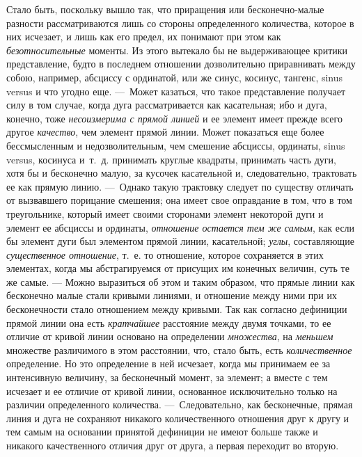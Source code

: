 Стало быть, поскольку вышло так, что приращения или бесконечно-малые
разности рассматриваются лишь со стороны определенного количества, которое
в них исчезает, и лишь как его предел, их понимают при этом как
{\em безотносительные} моменты. Из этого вытекало бы не
выдерживающее критики представление, будто в последнем отношении
дозволительно приравнивать между собою, например, абсциссу с ординатой, или
же синус, косинус, тангенс, sinus versus и что угодно еще. ---~Может
казаться, что такое представление получает силу в том случае, когда дуга
рассматривается как касательная; ибо и дуга, конечно, тоже
{\em несоизмерима с прямой линией} и ее элемент имеет
прежде всего другое {\em качество}, чем элемент прямой
линии. Может показаться еще более бессмысленным и недозволительным, чем
смешение абсциссы, ординаты, sinus versus, косинуса и~т.~д. принимать
круглые квадраты, принимать часть дуги, хотя бы и бесконечно малую, за
кусочек касательной и, следовательно, трактовать ее как прямую линию.
---~Однако такую трактовку следует по существу отличать от вызвавшего
порицание смешения; она имеет свое оправдание в том, что в том треугольнике,
который имеет своими сторонами элемент некоторой дуги и элемент ее абсциссы
и ординаты, {\em отношение остается тем же самым}, как
если бы элемент дуги был элементом прямой линии, касательной;
{\em углы}, составляющие
{\em существенное отношение}, т.~е. то отношение,
которое сохраняется в этих элементах, когда мы абстрагируемся от присущих
им конечных величин, суть те же самые. — Можно выразиться об этом и таким
образом, что прямые линии как бесконечно малые стали кривыми линиями, и
отношение между ними при их бесконечности стало отношением между кривыми.
Так как согласно дефиниции прямой линии она есть
{\em кратчайшее} расстояние между двумя точками, то ее
отличие от кривой линии основано на определении
{\em множества}, на {\em меньшем}
множестве различимого в этом расстоянии, что, стало быть, есть
{\em количественное} определение. Но это определение в
ней исчезает, когда мы принимаем ее за интенсивную величину, за бесконечный
момент, за элемент; а вместе с тем исчезает и ее отличие от кривой линии,
основанное исключительно только на различии определенного количества.
---~Следовательно, как бесконечные,
прямая линия и дуга не сохраняют никакого
количественного отношения друг к другу и тем самым на основании принятой
дефиниции не имеют больше также и никакого качественного отличия друг от
друга, а первая переходит во вторую.

